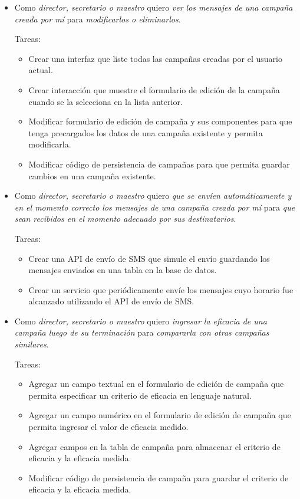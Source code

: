 \documentclass[a4paper, 10pt, twoside]{article}
\newenvironment{stories}{
  \begin{itemize}
}{
  \end{itemize}
}
\newcommand{\story}[3]{
  \item
  Como \emph{#1} quiero \emph{#2} para \emph{#3}.
}
\newenvironment{tasks}{
  Tareas:
  \begin{itemize}
}{
  \end{itemize}
}
\newcommand{\task}[1] {
  \item #1.
}
\begin{document}
\begin{stories}
  \story{director, secretario o maestro}
        {ver los mensajes de una campaña creada por mí}
        {modificarlos o eliminarlos}

  \begin{tasks}
    \task{Crear una interfaz que liste todas las campañas creadas por el usuario actual}
    \task{Crear interacción que muestre el formulario de edición de la campaña cuando se la selecciona en la lista anterior}
    \task{Modificar formulario de edición de campaña y sus componentes para que tenga precargados los datos de una campaña existente y permita modificarla}
    \task{Modificar código de persistencia de campañas para que permita guardar cambios en una campaña existente}
  \end{tasks}

  \story{director, secretario o maestro}
        {que se envíen automáticamente y en el momento correcto los mensajes de una campaña creada por mí}
        {que sean recibidos en el momento adecuado por sus destinatarios}

  \begin{tasks}
    \task{Crear una API de envío de SMS que simule el envío guardando los mensajes enviados en una tabla en la base de datos}
    \task{Crear un servicio que periódicamente envíe los mensajes cuyo horario fue alcanzado utilizando el API de envío de SMS}
  \end{tasks}

  \story{director, secretario o maestro}
        {ingresar la eficacia de una campaña luego de su terminación}
        {compararla con otras campañas similares}

  \begin{tasks}
    \task{Agregar un campo textual en el formulario de edición de campaña que permita especificar un criterio de eficacia en lenguaje natural}
    \task{Agregar un campo numérico en el formulario de edición de campaña que permita ingresar el valor de eficacia medido}
    \task{Agregar campos en la tabla de campaña para almacenar el criterio de eficacia y la eficacia medida}
    \task{Modificar código de persistencia de campaña para guardar el criterio de eficacia y la eficacia medida}
  \end{tasks}
\end{stories}
\end{document}

